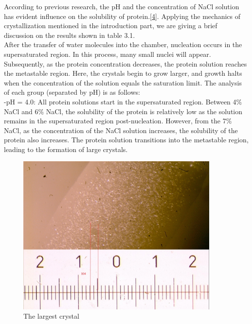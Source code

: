\documentclass[a4paper,english,12pt,bibliography=totoc]{scrreprt}
\begin{document}
According to previous research, the pH and the concentration of NaCl solution has evident influence on the solubility of protein.\hyperref[sec:ref_4]{[4]}. Applying the mechanics of crystallization mentioned in the introduction part, we are giving a brief discussion on the results shown in table 3.1.\\

After the transfer of water molecules into the chamber, nucleation occurs in the supersaturated region. In this process, many small nuclei will appear. Subsequently, as the protein concentration decreases, the protein solution reaches the metastable region. Here, the crystals begin to grow larger, and growth halts when the concentration of the solution equals the saturation limit. The analysis of each group (separated by pH) is as follows:\\

-pH = 4.0: All protein solutions start in the supersaturated region. Between 4\% NaCl and 6\% NaCl, the solubility of the protein is relatively low as the solution remains in the supersaturated region post-nucleation. However, from the 7\% NaCl, as the concentration of the NaCl solution increases, the solubility of the protein also increases. The protein solution transitions into the metastable region, leading to the formation of large crystals.\\

\begin{figure}[H]
        \centering
        \includegraphics[width=0.9\textwidth]{2. First draft of protein crystalization/Images/labelled-Image-8_2000-01-21.jpg}
	    \caption{The largest crystal}
\end{figure}
\end{document}
